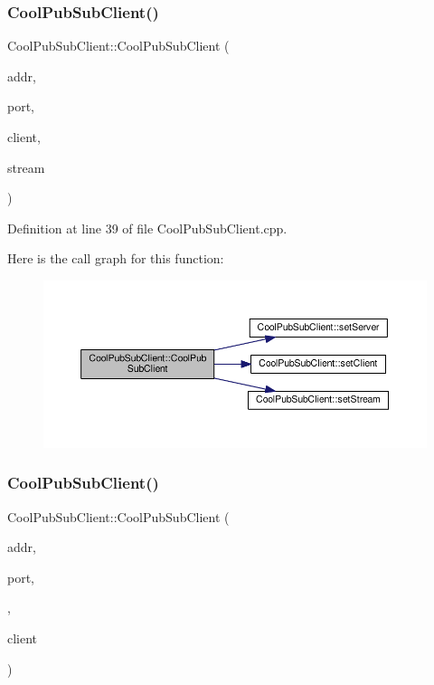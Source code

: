 \subsubsection{\texorpdfstring{Cool\+Pub\+Sub\+Client()}{CoolPubSubClient()}\hspace{0.1cm}{\footnotesize\ttfamily [4/14]}}
{\footnotesize\ttfamily Cool\+Pub\+Sub\+Client\+::\+Cool\+Pub\+Sub\+Client (\begin{DoxyParamCaption}\item[{I\+P\+Address}]{addr,  }\item[{uint16\+\_\+t}]{port,  }\item[{Client \&}]{client,  }\item[{Stream \&}]{stream }\end{DoxyParamCaption})}



Definition at line 39 of file Cool\+Pub\+Sub\+Client.\+cpp.

Here is the call graph for this function\+:\nopagebreak
\begin{figure}[H]
\begin{center}
\leavevmode
\includegraphics[width=350pt]{class_cool_pub_sub_client_af8b1aeb169366da52e3289bb6c238b6b_cgraph}
\end{center}
\end{figure}
\mbox{\label{class_cool_pub_sub_client_a1743a9eeef19b3b6ff1db5be8df55a9c}} 
\subsubsection{\texorpdfstring{Cool\+Pub\+Sub\+Client()}{CoolPubSubClient()}\hspace{0.1cm}{\footnotesize\ttfamily [5/14]}}
{\footnotesize\ttfamily Cool\+Pub\+Sub\+Client\+::\+Cool\+Pub\+Sub\+Client (\begin{DoxyParamCaption}\item[{I\+P\+Address}]{addr,  }\item[{uint16\+\_\+t}]{port,  }\item[{\hyperlink{class_cool_pub_sub_client_a021ec75e9fbaf658370b8005ccfddc14}{M\+Q\+T\+T\+\_\+\+C\+A\+L\+L\+B\+A\+C\+K\+\_\+\+S\+I\+G\+N\+A\+T\+U\+RE}}]{,  }\item[{Client \&}]{client }\end{DoxyParamCaption})}



